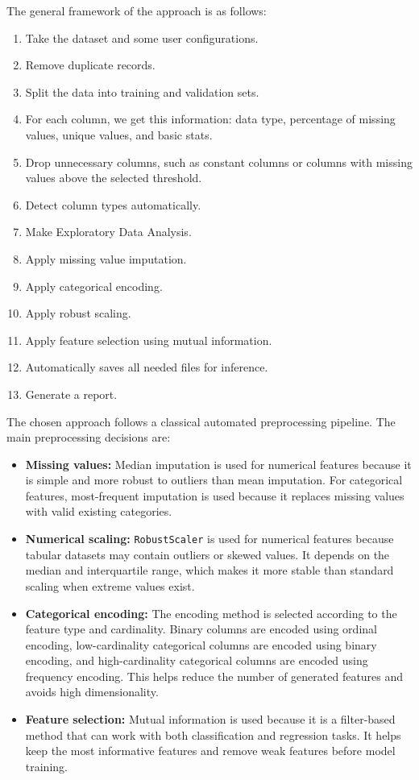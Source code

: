 \documentclass[12pt,a4paper]{report}
\begin{document}
\noindent The general framework of the approach is as follows:
\begin{enumerate}
  \item Take the dataset and some user configurations.
  \item Remove duplicate records.
  \item Split the data into training and validation sets.
  \item For each column, we get this information: data type, percentage of missing values, unique values, and basic stats.
  \item Drop unnecessary columns, such as constant columns or columns with
  missing values above the selected threshold.
  \item Detect column types automatically.
  \item Make Exploratory Data Analysis.
  \item Apply missing value imputation.
  \item Apply categorical encoding.
  \item Apply robust scaling.
  \item Apply feature selection using mutual information.
  \item Automatically saves all needed files for inference.
  \item Generate a report.
\end{enumerate}

\noindent The chosen approach follows a classical automated preprocessing pipeline. The
main preprocessing decisions are:

\begin{itemize}
  \item \textbf{Missing values:} Median imputation is used for numerical
  features because it is simple and more robust to outliers than mean
  imputation. For categorical features, most-frequent imputation is used because
  it replaces missing values with valid existing categories.

  \item \textbf{Numerical scaling:} \texttt{RobustScaler} is used for numerical
  features because tabular datasets may contain outliers or skewed values. It
  depends on the median and interquartile range, which makes it more stable than
  standard scaling when extreme values exist.

  \item \textbf{Categorical encoding:} The encoding method is selected according
  to the feature type and cardinality. Binary columns are encoded using ordinal
  encoding, low-cardinality categorical columns are encoded using binary
  encoding, and high-cardinality categorical columns are encoded using frequency
  encoding. This helps reduce the number of generated features and avoids high
  dimensionality.

  \item \textbf{Feature selection:} Mutual information is used because it is a
  filter-based method that can work with both classification and regression
  tasks. It helps keep the most informative features and remove weak features
  before model training.
\end{itemize}
\end{document}
